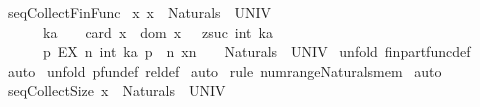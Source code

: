 \begin{isabellebody}
\isamarkupfalse%
%
\endisatagproof
{\isafoldproof}%
%
\isadelimproof
\isanewline
%
\endisadelimproof
\isanewline
\isanewline
{}\isamarkupfalse%
\ seq{\isacharunderscore}Collect{\isacharunderscore}Fin{\isacharunderscore}Func{\isacharcolon}\ \isanewline
{\isachardoublequoteopen}{\isacharbang}{\isacharbang}x{\isachardot}\ {\isacharbrackleft}{\isacharbar}x\ {\isacharcolon}\ {\isacharparenleft}Naturals\ {\isacharminus}{\isacharbar}{\isacharbar}{\isacharminus}{\isachargreater}\ UNIV{\isacharparenright}\ {\isacharsemicolon}\ \isanewline
\ \ \ \ \ \ {\isacharparenleft}ka\ {\isacharplus}\ {}{\isacharparenright}\ {\isacharequal}\ {\isacharparenleft}card\ x{\isacharparenright}\ {\isacharsemicolon}\ {\isacharparenleft}{\isacharparenleft}dom\ x{\isacharparenright}\ {\isacharequal}\ {\isacharparenleft}{}{\isachardot}{\isachardot}\ zsuc\ {\isacharparenleft}int\ ka{\isacharparenright}{\isacharparenright}{\isacharparenright}{\isacharbar}{\isacharbrackright}\ {\isacharequal}{\isacharequal}{\isachargreater}\ \ \ \ \ \ \ \ \ \ \ \ \ \ \ \ \ \isanewline
\ \ \ \ \ \ {\isacharbraceleft}p{\isachardot}\ EX\ n{\isacharcolon}\ {}{\isachardot}{\isachardot}{\isacharparenleft}int\ ka{\isacharparenright}{\isachardot}\ p\ {\isacharequal}\ {\isacharparenleft}n{\isacharcomma}\ x{\isacharpercent}{\isacharcircum}n\ {\isacharplus}\ {}{\isacharparenright}{\isacharbraceright}\ {\isacharcolon}\ {\isacharparenleft}Naturals\ {\isacharminus}{\isacharbar}{\isacharbar}{\isacharminus}{\isachargreater}\ UNIV{\isacharparenright}{\isachardoublequoteclose}\isanewline
%
\isadelimproof
%
\endisadelimproof
%
\isatagproof
{}\isamarkupfalse%
\ {\isacharparenleft}unfold\ fin{\isacharunderscore}part{\isacharunderscore}func{\isacharunderscore}def{\isacharparenright}\isanewline
{}\isamarkupfalse%
\ auto\isanewline
{}\isamarkupfalse%
\ {\isacharparenleft}unfold\ pfun{\isacharunderscore}def\ rel{\isacharunderscore}def{\isacharparenright}\isanewline
{}\isamarkupfalse%
\ auto\isanewline
{}\isamarkupfalse%
\ {\isacharparenleft}rule\ num{\isacharunderscore}range{\isacharunderscore}Naturals{\isacharunderscore}mem{\isacharparenright}\isanewline
{}\isamarkupfalse%
\ auto\isanewline
{}\isamarkupfalse%
%
\endisatagproof
{\isafoldproof}%
%
\isadelimproof
\isanewline
%
\endisadelimproof
\isanewline
{}\isamarkupfalse%
\ seq{\isacharunderscore}Collect{\isacharunderscore}Size{\isacharcolon}\ {\isachardoublequoteopen}{\isacharbrackleft}{\isacharbar}x\ {\isacharcolon}\ {\isacharparenleft}Naturals\ {\isacharminus}{\isacharbar}{\isacharbar}{\isacharminus}{\isachargreater}\ UNIV{\isacharparenright}\ {\isacharsemicolon}\ \ \isanewline

\end{isabellebody}
